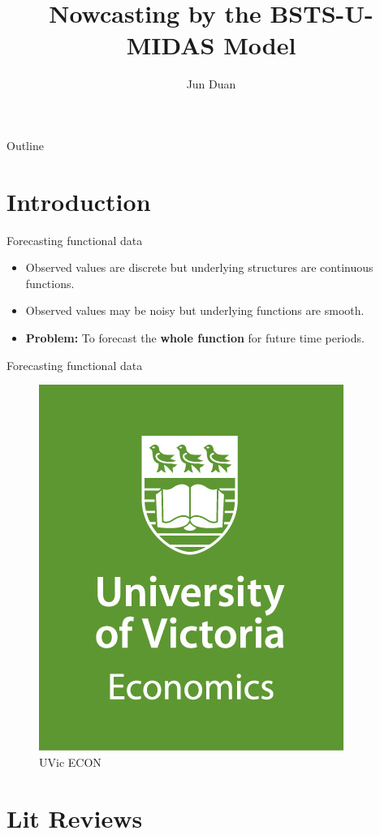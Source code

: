 \documentclass[14pt,xcolor=dvipsnames]{beamer}
\title{Nowcasting by the BSTS-U-MIDAS Model}
\author{Jun Duan}
\begin{document}
\begin{frame}
\titlepage
\end{frame}

\begin{frame}{Outline}
\tableofcontents
\end{frame}

\section{Introduction}

\begin{frame}{Forecasting functional data}
\begin{itemize}[<+-| alert@+>]
\item Observed values are discrete but underlying structures are continuous functions.
\item Observed values may be noisy but underlying functions are smooth.
\item \textbf{Problem:} To forecast the \textbf{whole function} for future time periods.
\end{itemize}
\end{frame}




\begin{frame}{Forecasting functional data}
\begin{figure}
\centering
\includegraphics[width=0.3\linewidth]{uvicecon}
\caption{UVic ECON}
\label{fig:uvicecon}
\end{figure}

\end{frame}


\section{Lit Reviews}
\end{document}
